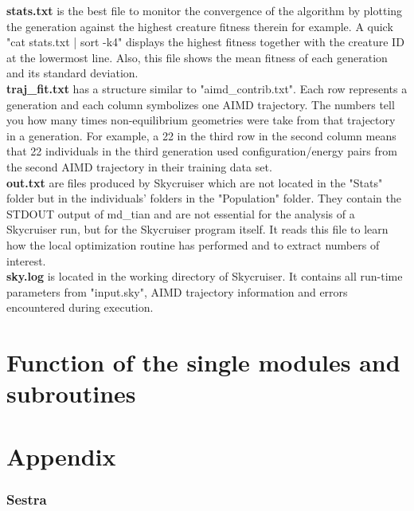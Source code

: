 \documentclass[twoside, 11pt, titlepage, captions=nooneline, a4paper, headsepline]{scrbook}%
\newcommand{\9}{\mathrm}
\newcommand{\0}{\,\mathrm}
\begin{document}
\textbf{stats.txt} is the best file to monitor the convergence of the algorithm by plotting the generation against the highest creature fitness therein for example. A quick "cat stats.txt | sort -k4" displays the highest fitness together with the creature ID at the lowermost line. Also, this file shows the mean fitness of each generation and its standard deviation.\\
\textbf{traj\_fit.txt} has a structure similar to "aimd\_contrib.txt". Each row represents a generation and each column symbolizes one AIMD trajectory. The numbers tell you how many times non-equilibrium geometries were take from that trajectory in a generation. For example, a 22 in the third row in the second column means that 22 individuals in the third generation used configuration/energy pairs from the second AIMD trajectory in their training data set.\\
\textbf{out.txt} are files produced by Skycruiser which are not located in the "Stats" folder but in the individuals' folders in the "Population" folder. They contain the STDOUT output of md\_tian and are not essential for the analysis of a Skycruiser run, but for the Skycruiser program itself. It reads this file to learn how the local optimization routine has performed and to extract numbers of interest.\\
\textbf{sky.log} is located in the working directory of Skycruiser. It contains all run-time parameters from "input.sky", AIMD trajectory information and errors encountered during execution.






\chapter{Function of the single modules and subroutines}



\chapter{Appendix}

\subsection{Sestra}
\label{Sestra}
\end{document}
